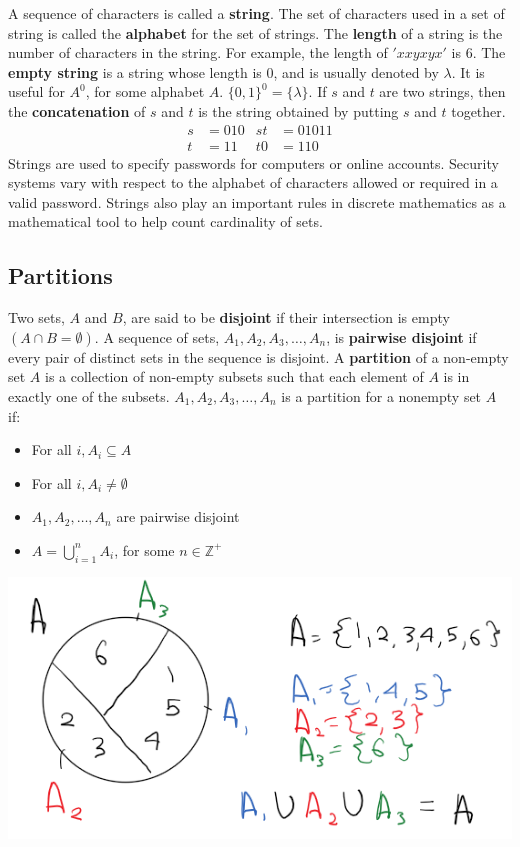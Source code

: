 A sequence of characters is called a \textbf{string}.
The set of characters used in a set of string is called the \textbf{alphabet} for the set of strings.
The \textbf{length} of a string is the number of characters in the string.
For example, the length of $'xxyxyx'$ is $6$.
The \textbf{empty string} is a string whose length is $0$, and is usually denoted by $\lambda$.
It is useful for $A^0$, for some alphabet $A$. $\{0, 1\}^0 = \{\lambda\}$.
If $s$ and $t$ are two strings, then the \textbf{concatenation} of $s$ and $t$ is the string obtained by putting $s$ and $t$ together.
\begin{align*}
  s & = 010 & st & = 01011 \\
  t & = 11  & t0 & = 110
\end{align*}
Strings are used to specify passwords for computers or online accounts.
Security systems vary with respect to the alphabet of characters allowed or required in a valid password.
Strings also play an important rules in discrete mathematics as a mathematical tool to help count cardinality of sets.

\subsection{Partitions}

Two sets, $A$ and $B$, are said to be \textbf{disjoint} if their intersection is empty $(A \cap B = \emptyset)$.
A sequence of sets, $A_1, A_2, A_3, \ldots, A_n$, is \textbf{pairwise disjoint} if every pair of distinct sets in the sequence is disjoint.
A \textbf{partition} of a non-empty set $A$ is a collection of non-empty subsets such that each element of $A$ is in exactly one of the subsets.
$A_1, A_2, A_3, \ldots, A_n$ is a partition for a nonempty set $A$ if:
\begin{itemize}
  \item For all $i, A_i \subseteq A$
  \item For all $i, A_i \not = \emptyset$
  \item $A_1, A_2, \ldots, A_n$ are pairwise disjoint
  \item $A = \bigcup_{i=1}^{n} A_i$, for some $n \in \mathbb{Z}^+$
\end{itemize}
\begin{center}
  \includegraphics[width=.6\linewidth]{resources/partitions.png}
\end{center}